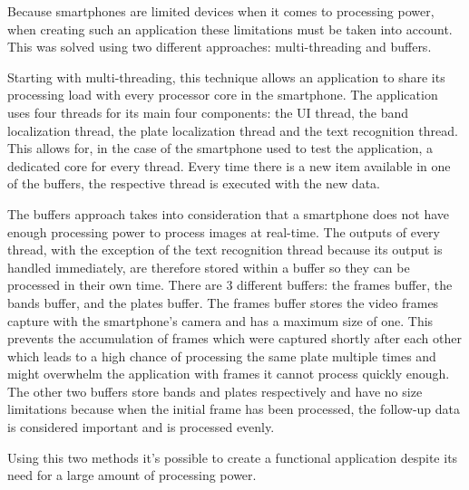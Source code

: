 
Because smartphones are limited devices when it comes to processing power, when creating such an application these limitations must be taken into account. This was solved using two different approaches: multi-threading and buffers.

Starting with multi-threading, this technique allows an application to share its processing load with every processor core in the smartphone. The application uses four threads for its main four components: the UI thread, the band localization thread, the plate localization thread and the text recognition thread. This allows for, in the case of the smartphone used to test the application, a dedicated core for every thread. Every time there is a new item available in one of the buffers, the respective thread is executed with the new data.

The buffers approach takes into consideration that a smartphone does not have enough processing power to process images at real-time. The outputs of every thread, with the exception of the text recognition thread because its output is handled immediately, are therefore stored within a buffer so they can be processed in their own time. There are 3 different buffers: the frames buffer, the bands buffer, and the plates buffer. 
The frames buffer stores the video frames capture with the smartphone's camera and has a maximum size of one. This prevents the accumulation of frames which were captured shortly after each other which leads to a high chance of processing the same plate multiple times and might overwhelm the application with frames it cannot process quickly enough. The other two buffers store bands and plates respectively and have no size limitations because when the initial frame has been processed, the follow-up data is considered important and is processed evenly.

Using this two methods it's possible to create a functional application despite its need for a large amount of processing power.



